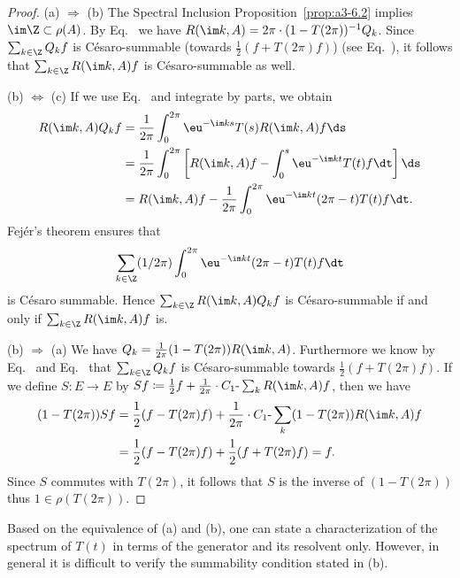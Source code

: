 \begin{proof}
(a) $\Rightarrow$ (b) The Spectral Inclusion Proposition~\ref{prop:a3-6.2} implies $\im\Z \subset \rho(A)$.
By Eq.~ we have $R(\im k,A) = 2\pi\cdot(1-T(2\pi))^{-1}Q_{k}$.
Since $\sum_{k\in\Z} Q_{k}f$ is Césaro-summable (\mbox{towards} $\frac{1}{2}(f + T(2\pi)f)$) (see Eq.~), it follows that $\sum_{k\in\Z} R(\im k,A)f$ is Césaro-summable as well.

(b) $\Leftrightarrow$ (c) If we use Eq.~ and integrate by parts, we obtain
\begin{align*}
R(\im k,A)Q_{k}f &= \frac{1}{2\pi}\int_{0}^{2\pi} \eu^{-\im ks} T(s)R(\im k,A)f \ds \\
&= \frac{1}{2\pi}\int_{0}^{2\pi} \left[R(\im k,A)f - \int_{0}^{s} \eu^{-\im kt} T(t)f \dt\right] \ds \\
&= R(\im k,A)f - \frac{1}{2\pi}\int_{0}^{2\pi} \eu^{-\im kt} (2\pi-t) T(t)f \dt .
\end{align*}
Fejér's theorem ensures that 
%
\[
	 \sum_{k\in\Z} (1/2\pi)\int_{0}^{2\pi} \eu^{-\im kt} (2\pi-t) T(t)f \dt 
\]
%
is Césaro summable.
Hence $\sum_{k\in\Z} R(\im k,A)Q_{k}f$ is Césaro-summable if and only if\/ $\sum_{k\in\Z} R(\im k,A)f$ is.

(b) $\Rightarrow$ (a) We have $Q_{k} = \frac{1}{2\pi}(1 - T(2\pi))R(\im k,A)$.
Furthermore we know by Eq.~ and Eq.~  that $\sum_{k\in\Z} Q_{k}f$ is Césaro-summable towards $\frac{1}{2}(f + T(2\pi)f)$.
If we define $S \colon E \to E$ by $Sf \coloneqq \frac{1}{2}f + \frac{1}{2\pi}\cdot C_{1}\text{-}\sum_k R(\im k,A)f$, then we have
\begin{align*}
(1 - T(2\pi))Sf &= \frac{1}{2}(f - T(2\pi)f) + \frac{1}{2\pi}\cdot C_{1}\text{-}\sum_k (1 - T(2\pi))R(\im k,A)f \\
&= \frac{1}{2}(f - T(2\pi)f) + \frac{1}{2}(f + T(2\pi)f) = f .
\end{align*}
Since $S$ commutes with $T(2\pi)$, it follows that $S$ is the inverse of\/ $(1 - T(2\pi))$ thus $1 \in \rho(T(2\pi))$.
\end{proof}
Based on the equivalence of (a) and (b), one can state a characterization of the spectrum of\/ $T(t)$ in terms of the generator and its resolvent only.
However, in general it is difficult to verify the summability condition stated in (b).

